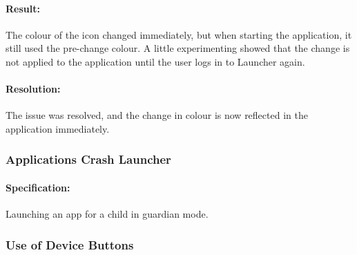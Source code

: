 \paragraph{Result:} The colour of the icon changed immediately, but when starting the application, it still used the pre-change colour. A little experimenting showed that the change is not applied to the application until the user logs in to Launcher again.
\paragraph{Resolution:} The issue was resolved, and the change in colour is now reflected in the application immediately.

\subsubsection*{Applications Crash Launcher}
\paragraph{Specification:} Launching an app for a child in guardian mode.

\subsubsection*{Use of Device Buttons}








